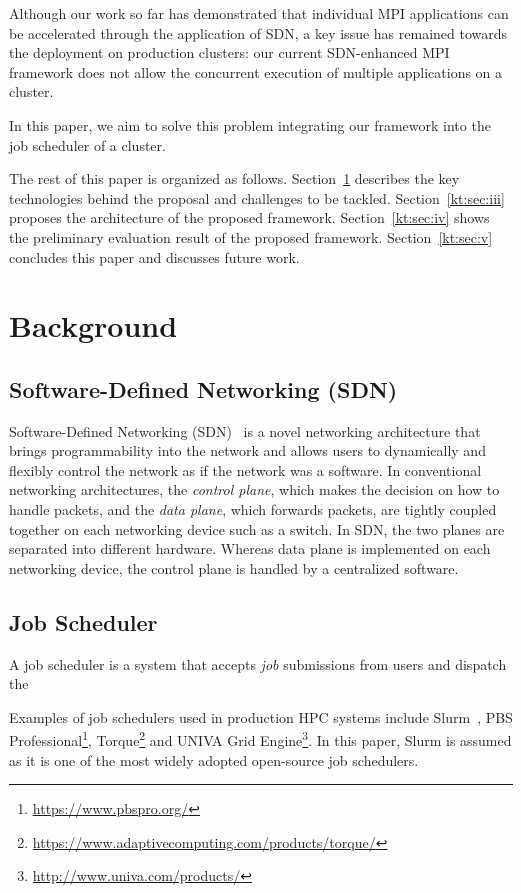 \documentclass[graybox]{svmult}
\begin{document}
Although our work so far has demonstrated that individual MPI applications can
be accelerated through the application of SDN, a key issue has remained
towards the deployment on production clusters: our current SDN-enhanced MPI
framework does not allow the concurrent execution of multiple applications on
a cluster.

In this paper, we aim to solve this problem integrating our framework into the
job scheduler of a cluster.

The rest of this paper is organized as follows. Section~\ref{kt:sec:ii}
describes the key technologies behind the proposal and challenges to be tackled.
Section~\ref{kt:sec:iii} proposes the architecture of the proposed framework.
Section~\ref{kt:sec:iv} shows the preliminary evaluation result of the
proposed framework. Section~\ref{kt:sec:v} concludes this paper and discusses
future work.

\section{Background}\label{kt:sec:ii}

\subsection{Software-Defined Networking (SDN)}

Software-Defined Networking (SDN)~\cite{McKeown2008} is a novel networking
architecture that brings programmability into the network and allows users to
dynamically and flexibly control the network as if the network was a software.
In conventional networking architectures, the \textit{control plane}, which
makes the decision on how to handle packets, and the \textit {data plane},
which forwards packets, are tightly coupled together on each networking device
such as a switch. In SDN, the two planes are separated into different
hardware. Whereas data plane is implemented on each networking device, the
control plane is handled by a centralized software.

\subsection{Job Scheduler}

A job scheduler is a system that accepts \textit{job} submissions from users
and dispatch the

Examples of job schedulers used in production HPC systems include
Slurm~\cite{Yoo2003}, PBS
Professional\footnote{\url{https://www.pbspro.org/}},
Torque\footnote{\url{https://www.adaptivecomputing.com/products/torque/}} and
UNIVA Grid Engine\footnote{\url{http://www.univa.com/products/}}. In this
paper, Slurm is assumed as it is one of the most widely adopted open-source
job schedulers.
\end{document}
